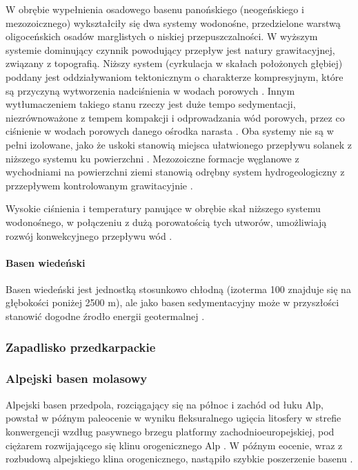 \documentclass[11.5pt,twoside]{report}
\begin{document}
 W obrębie wypełnienia osadowego basenu panońskiego (neogeńskiego i mezozoicznego) wykształciły się dwa systemy wodonośne, przedzielone warstwą oligoceńskich osadów marglistych o niskiej przepuszczalności. W wyższym systemie dominujący czynnik powodujący przepływ jest natury grawitacyjnej, związany z topografią. Niższy system (cyrkulacja w skałach położonych głębiej) poddany jest oddziaływaniom tektonicznym o charakterze kompresyjnym, które są przyczyną wytworzenia nadciśnienia w wodach porowych \parencite{Toth.2001}. Innym wytłumaczeniem takiego stanu rzeczy jest duże tempo sedymentacji, niezrównoważone z tempem kompakcji i odprowadzania wód porowych, przez co ciśnienie w wodach porowych danego ośrodka narasta \parencite{Horvath.2015}. Oba systemy nie są w pełni izolowane, jako że uskoki stanowią miejsca ułatwionego przepływu solanek z niższego systemu ku powierzchni \parencite{Toth.2001}. Mezozoiczne formacje węglanowe z wychodniami na powierzchni ziemi stanowią odrębny system hydrogeologiczny z przzepływem kontrolowanym grawitacyjnie \parencite{Horvath.2015}. 
 
 Wysokie ciśnienia i temperatury panujące w obrębie skał niższego systemu wodonośnego, w połączeniu z dużą porowatością tych utworów, umożliwiają rozwój konwekcyjnego przepływu wód \parencite{Horvath.2015}.
 
 
	\paragraph{Basen wiedeński}

Basen wiedeński jest jednostką stosunkowo chłodną (izoterma 100 \textcelsius znajduje się na głębokości poniżej 2500 m), ale jako basen sedymentacyjny może w przyszłości stanowić dogodne \'{z}rodło energii geotermalnej \parencite{Hoyer.2012}.

 
 \subsubsection{Zapadlisko przedkarpackie}
 
 \subsubsection{Alpejski basen molasowy}
 
 Alpejski basen przedpola, rozciągający się na północ i zachód od łuku Alp, powstał w pó\'{z}nym paleocenie w wyniku fleksuralnego ugięcia litosfery w strefie konwergencji wzdług pasywnego brzegu platformy zachodnioeuropejskiej, pod ciężarem rozwijającego się klinu orogenicznego Alp \parencite{Sissingh.2006a}. W pó\'{z}nym eocenie, wraz z rozbudową alpejskiego klina orogenicznego, nastąpiło szybkie poszerzenie basenu \parencite{Dezes.2004}.
 
\end{document}
